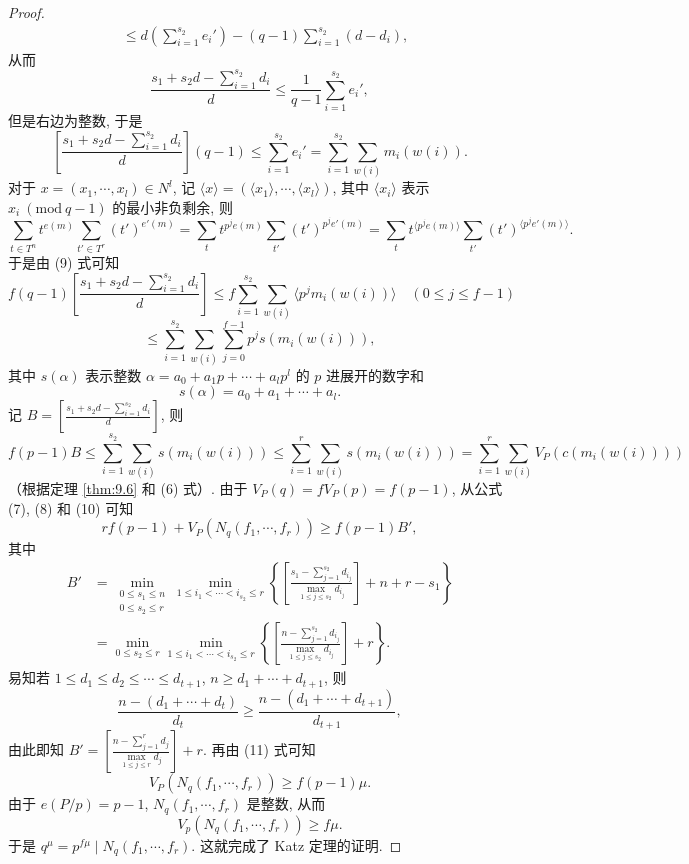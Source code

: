 \begin{proof}
\begin{align*}
  &\leqslant d\left(\sum_{i=1}^{s_2}e_i'\right)-(q-1)\sum_{i=1}^{s_2}(d-d_i),
\end{align*}
从而
\[
  \frac{s_1+s_2d-\sum_{i=1}^{s_2}d_i}{d}
  \leqslant\frac{1}{q-1}\sum_{i=1}^{s_2}e_i',
\]
但是右边为整数, 于是
\begin{equation}\tag{9}
  \left[\frac{s_1+s_2d-\sum_{i=1}^{s_2}d_i}{d}\right](q-1)
  \leqslant\sum_{i=1}^{s_2}e_i'
  =\sum_{i=1}^{s_2}\sum_{w(i)}m_i(w(i)).
\end{equation}
对于 $x=(x_1,\cdots,x_l)\in N^l$, 记 $\langle x\rangle=(\langle x_1\rangle,\cdots,\langle x_l\rangle)$, 其中 $\langle x_i\rangle$ 表示 $x_i\ (\mathrm{mod}\ q-1)$ 的最小非负剩余, 则
\[
  \sum_{t\in T^n}t^{e(m)}\sum_{t'\in T^r}(t')^{e'(m)}
  =\sum_t t^{p^je(m)}\sum_{t'}(t')^{p^je'(m)}
  =\sum_t t^{\langle p^je(m)\rangle}\sum_{t'}(t')^{\langle p^je'(m)\rangle}.
\]
于是由 (9) 式可知
\[
  f(q-1)\left[\frac{s_1+s_2d-\sum_{i=1}^{s_2}d_i}{d}\right]
  \leqslant f\sum_{i=1}^{s_2}\sum_{w(i)}\langle p^jm_i(w(i))\rangle
  \quad(0\leqslant j\leqslant f-1)
\]
\[
  \leqslant\sum_{i=1}^{s_2}\sum_{w(i)}\sum_{j=0}^{f-1}p^js(m_i(w(i))),
\]
其中 $s(\alpha)$ 表示整数 $\alpha=a_0+a_1p+\cdots+a_lp^l$ 的 $p$ 进展开的数字和
\[
  s(\alpha)=a_0+a_1+\cdots+a_l.
\]
记 $B=\left[\frac{s_1+s_2d-\sum_{i=1}^{s_2}d_i}{d}\right]$, 则
\begin{equation}\tag{10}
  f(p-1)B\leqslant\sum_{i=1}^{s_2}\sum_{w(i)}s(m_i(w(i)))
  \leqslant\sum_{i=1}^{r}\sum_{w(i)}s(m_i(w(i)))
  =\sum_{i=1}^{r}\sum_{w(i)}V_P(c(m_i(w(i))))
\end{equation}
（根据定理 \ref{thm:9.6} 和 (6) 式）. 由于 $V_P(q)=fV_P(p)=f(p-1)$, 从公式 (7), (8) 和 (10) 可知
\begin{equation}\tag{11}
  rf(p-1)+V_P\left(N_q(f_1,\cdots,f_r)\right)\geqslant f(p-1)B',
\end{equation}
其中
\begin{align*}
  B'&=\min_{\substack{0\leqslant s_1\leqslant n\\ 0\leqslant s_2\leqslant r}}
  \min_{1\leqslant i_1<\cdots<i_{s_2}\leqslant r}
  \left\{\left[\frac{s_1-\sum_{j=1}^{s_2}d_{i_j}}
  {\max\limits_{1\leqslant j\leqslant s_2}d_{i_j}}\right]+n+r-s_1\right\}\\
  &=\min_{0\leqslant s_2\leqslant r}\min_{1\leqslant i_1<\cdots<i_{s_2}\leqslant r}
  \left\{\left[\frac{n-\sum_{j=1}^{s_2}d_{i_j}}
  {\max\limits_{1\leqslant j\leqslant s_2}d_{i_j}}\right]+r\right\}.
\end{align*}
易知若 $1\leqslant d_1\leqslant d_2\leqslant\cdots\leqslant d_{t+1}$, $n\geqslant d_1+\cdots+d_{t+1}$, 则
\[
  \frac{n-(d_1+\cdots+d_t)}{d_t}
  \geqslant\frac{n-(d_1+\cdots+d_{t+1})}{d_{t+1}},
\]
由此即知 $B'=\left[\frac{n-\sum_{j=1}^{r}d_j}{\max\limits_{1\leqslant j\leqslant r}d_j}\right]+r$. 再由 (11) 式可知
\[
  V_P\left(N_q(f_1,\cdots,f_r)\right)\geqslant f(p-1)\mu.
\]
由于 $e(P/p)=p-1$, $N_q(f_1,\cdots,f_r)$ 是整数, 从而
\[
  V_p\left(N_q(f_1,\cdots,f_r)\right)\geqslant f\mu.
\]
于是 $q^{\mu}=p^{f\mu}\mid N_q(f_1,\cdots,f_r)$. 这就完成了 Katz 定理的证明.
\end{proof}

